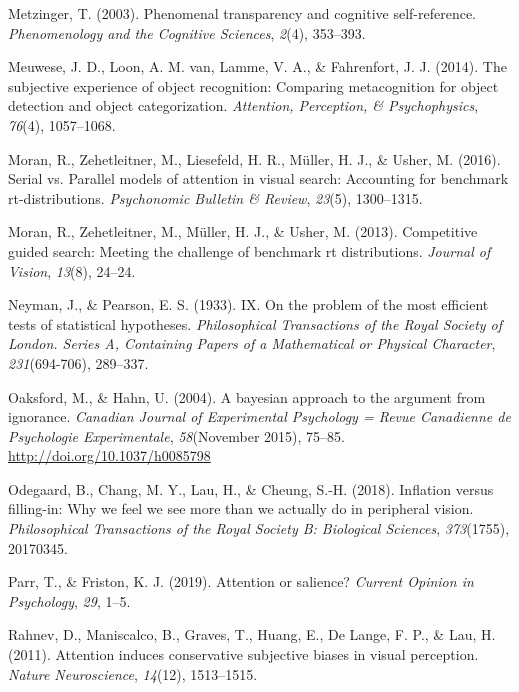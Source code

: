 \documentclass[12pt,twoside]{reedthesis}
\begin{document}
\leavevmode\hypertarget{ref-metzinger2003phenomenal}{}%
Metzinger, T. (2003). Phenomenal transparency and cognitive self-reference. \emph{Phenomenology and the Cognitive Sciences}, \emph{2}(4), 353--393.

\leavevmode\hypertarget{ref-meuwese2014subjective}{}%
Meuwese, J. D., Loon, A. M. van, Lamme, V. A., \& Fahrenfort, J. J. (2014). The subjective experience of object recognition: Comparing metacognition for object detection and object categorization. \emph{Attention, Perception, \& Psychophysics}, \emph{76}(4), 1057--1068.

\leavevmode\hypertarget{ref-moran2016serial}{}%
Moran, R., Zehetleitner, M., Liesefeld, H. R., Müller, H. J., \& Usher, M. (2016). Serial vs. Parallel models of attention in visual search: Accounting for benchmark rt-distributions. \emph{Psychonomic Bulletin \& Review}, \emph{23}(5), 1300--1315.

\leavevmode\hypertarget{ref-moran2013competitive}{}%
Moran, R., Zehetleitner, M., Müller, H. J., \& Usher, M. (2013). Competitive guided search: Meeting the challenge of benchmark rt distributions. \emph{Journal of Vision}, \emph{13}(8), 24--24.

\leavevmode\hypertarget{ref-neyman1933ix}{}%
Neyman, J., \& Pearson, E. S. (1933). IX. On the problem of the most efficient tests of statistical hypotheses. \emph{Philosophical Transactions of the Royal Society of London. Series A, Containing Papers of a Mathematical or Physical Character}, \emph{231}(694-706), 289--337.

\leavevmode\hypertarget{ref-Oaksford2004}{}%
Oaksford, M., \& Hahn, U. (2004). A bayesian approach to the argument from ignorance. \emph{Canadian Journal of Experimental Psychology = Revue Canadienne de Psychologie Experimentale}, \emph{58}(November 2015), 75--85. \url{http://doi.org/10.1037/h0085798}

\leavevmode\hypertarget{ref-odegaard2018inflation}{}%
Odegaard, B., Chang, M. Y., Lau, H., \& Cheung, S.-H. (2018). Inflation versus filling-in: Why we feel we see more than we actually do in peripheral vision. \emph{Philosophical Transactions of the Royal Society B: Biological Sciences}, \emph{373}(1755), 20170345.

\leavevmode\hypertarget{ref-parr2019attention}{}%
Parr, T., \& Friston, K. J. (2019). Attention or salience? \emph{Current Opinion in Psychology}, \emph{29}, 1--5.

\leavevmode\hypertarget{ref-rahnev2011attention}{}%
Rahnev, D., Maniscalco, B., Graves, T., Huang, E., De Lange, F. P., \& Lau, H. (2011). Attention induces conservative subjective biases in visual perception. \emph{Nature Neuroscience}, \emph{14}(12), 1513--1515.
\end{document}
